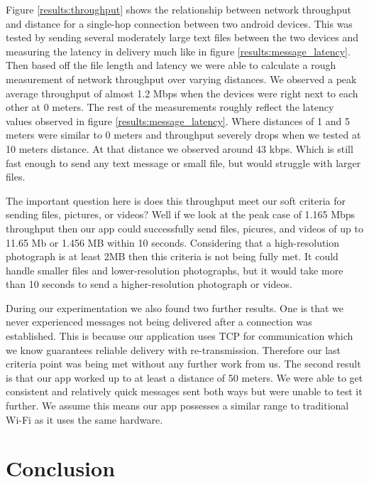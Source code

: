 \documentclass[10pt]{article}
\begin{document}
Figure \ref{results:throughput} shows the relationship between network throughput and distance for a single-hop connection between two android devices. This was tested by sending several moderately large text files between the two devices and measuring the latency in delivery much like in figure \ref{results:message_latency}. Then based off the file length and latency we were able to calculate a rough measurement of network throughput over varying distances. We observed a peak average throughput of almost 1.2 Mbps when the devices were right next to each other at 0 meters. The rest of the measurements roughly reflect the latency values observed in figure \ref{results:message_latency}. Where distances of 1 and 5 meters were similar to 0 meters and throughput severely drops when we tested at 10 meters distance. At that distance we observed around 43 kbps. Which is still fast enough to send any text message or small file, but would struggle with larger files. 

The important question here is does this throughput meet our soft criteria for sending files, pictures, or videos? Well if we look at the peak case of 1.165 Mbps throughput then our app could successfully send files, picures, and videos of up to 11.65 Mb or 1.456 MB within 10 seconds. Considering that a high-resolution photograph is at least 2MB then this criteria is not being fully met. It could handle smaller files and lower-resolution photographs, but it would take more than 10 seconds to send a higher-resolution photograph or videos.

During our experimentation we also found two further results. One is that we never experienced messages not being delivered after a connection was established. This is because our application uses TCP for communication which we know guarantees reliable delivery with re-transmission. Therefore our last criteria point was being met without any further work from us. The second result is that our app worked up to at least a distance of 50 meters. We were able to get consistent and relatively quick messages sent both ways but were unable to test it further. We assume this means our app possesses a similar range to traditional Wi-Fi as it uses the same hardware.

\section{Conclusion}

\end{document}
